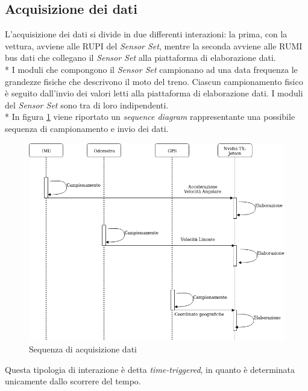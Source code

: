 	\subsection{Acquisizione dei dati}
	L'acquisizione dei dati si divide in due differenti interazioni: la prima, con la vettura, avviene alle RUPI del \emph{Sensor Set}, mentre la seconda avviene alle RUMI bus dati che collegano il \emph{Sensor Set} alla piattaforma di elaborazione dati.\\*
	I moduli che compongono il \emph{Sensor Set} campionano ad una data frequenza le grandezze fisiche che descrivono il moto del treno. Ciascun campionamento fisico \`e seguito dall'invio dei valori letti alla piattaforma di elaborazione dati. I moduli del \emph{Sensor Set} sono tra di loro indipendenti.\\* 
	In figura \ref{fig:seqdiag} viene riportato un \emph{sequence diagram} rappresentante una possibile sequenza di campionamento e invio dei dati.
	\begin{figure}[h]
		\centering
		\includegraphics[width=0.7\linewidth]{img/seqdiag}
		\caption{Sequenza di acquisizione dati}
		\label{fig:seqdiag}
	\end{figure}
	Questa tipologia di interazione \`e detta \emph{time-triggered}, in quanto \`e determinata unicamente dallo scorrere del tempo. \cite{timetriggered}
